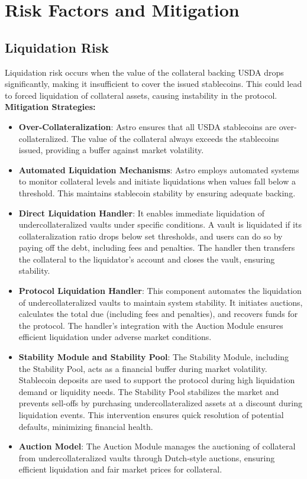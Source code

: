 \newpage
\section{Risk Factors and Mitigation}

\subsection{Liquidation Risk}
Liquidation risk occurs when the value of the collateral backing USDA drops significantly, making it insufficient to cover the issued stablecoins. This could lead to forced liquidation of collateral assets, causing instability in the protocol.\\

\textbf{Mitigation Strategies:}
\begin{itemize}
    \item \textbf{Over-Collateralization}: Astro ensures that all USDA stablecoins are over-collateralized. The value of the collateral always exceeds the stablecoins issued, providing a buffer against market volatility.
    \item \textbf{Automated Liquidation Mechanisms}: Astro employs automated systems to monitor collateral levels and initiate liquidations when values fall below a threshold. This maintains stablecoin stability by ensuring adequate backing.
    \item \textbf{Direct Liquidation Handler}: It enables immediate liquidation of undercollateralized vaults under specific conditions. A vault is liquidated if its collateralization ratio drops below set thresholds, and users can do so by paying off the debt, including fees and penalties. The handler then transfers the collateral to the liquidator’s account and closes the vault, ensuring stability.
    \item \textbf{Protocol Liquidation Handler}: This component automates the liquidation of undercollateralized vaults to maintain system stability. It initiates auctions, calculates the total due (including fees and penalties), and recovers funds for the protocol. The handler’s integration with the Auction Module ensures efficient liquidation under adverse market conditions.
    \item \textbf{Stability Module and Stability Pool}: The Stability Module, including the Stability Pool, acts as a financial buffer during market volatility. Stablecoin deposits are used to support the protocol during high liquidation demand or liquidity needs. The Stability Pool stabilizes the market and prevents sell-offs by purchasing undercollateralized assets at a discount during liquidation events. This intervention ensures quick resolution of potential defaults, minimizing financial health.
    \item \textbf{Auction Model}: The Auction Module manages the auctioning of collateral from undercollateralized vaults through Dutch-style auctions, ensuring efficient liquidation and fair market prices for collateral.
\end{itemize}

